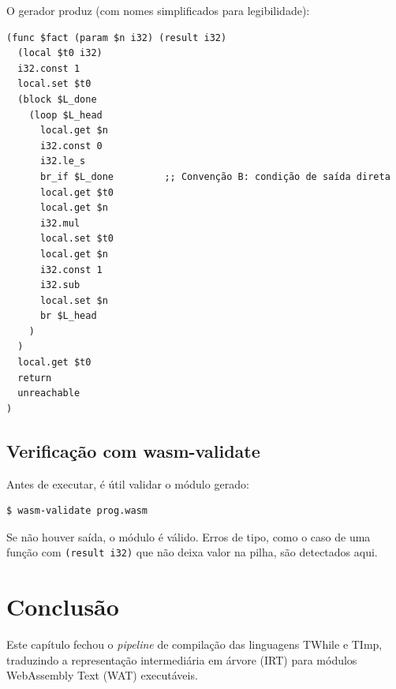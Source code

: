 O gerador produz (com nomes simplificados para legibilidade):

\begin{verbatim}
(func $fact (param $n i32) (result i32)
  (local $t0 i32)
  i32.const 1
  local.set $t0
  (block $L_done
    (loop $L_head
      local.get $n
      i32.const 0
      i32.le_s
      br_if $L_done         ;; Convenção B: condição de saída direta
      local.get $t0
      local.get $n
      i32.mul
      local.set $t0
      local.get $n
      i32.const 1
      i32.sub
      local.set $n
      br $L_head
    )
  )
  local.get $t0
  return
  unreachable
)
\end{verbatim}

\subsection{Verificação com wasm-validate}

Antes de executar, é útil validar o módulo gerado:

\begin{verbatim}
$ wasm-validate prog.wasm
\end{verbatim}

Se não houver saída, o módulo é válido.  Erros de tipo, como o caso de uma
função com \texttt{(result i32)} que não deixa valor na pilha, são detectados aqui.

\section{Conclusão}\label{sec:wat-conclusao}

Este capítulo fechou o \emph{pipeline} de compilação das linguagens TWhile e
TImp, traduzindo a representação intermediária em árvore (IRT) para módulos
WebAssembly Text (WAT) executáveis.

